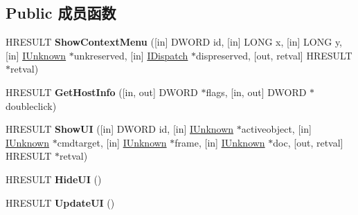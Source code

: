 \subsection*{Public 成员函数}
\begin{DoxyCompactItemize}
\item 
\mbox{\label{interface_i_doc_host_u_i_handler_dispatch_a6ec0e4b20d506e4c95957459a9c4de8c}} 
H\+R\+E\+S\+U\+LT {\bfseries Show\+Context\+Menu} (\mbox{[}in\mbox{]} D\+W\+O\+RD id, \mbox{[}in\mbox{]} L\+O\+NG x, \mbox{[}in\mbox{]} L\+O\+NG y, \mbox{[}in\mbox{]} \hyperlink{interface_i_unknown}{I\+Unknown} $\ast$unkreserved, \mbox{[}in\mbox{]} \hyperlink{interface_i_dispatch}{I\+Dispatch} $\ast$dispreserved, \mbox{[}out, retval\mbox{]} H\+R\+E\+S\+U\+LT $\ast$retval)
\item 
\mbox{\label{interface_i_doc_host_u_i_handler_dispatch_af64a9623759a8f97ec7f4f6321c84bca}} 
H\+R\+E\+S\+U\+LT {\bfseries Get\+Host\+Info} (\mbox{[}in, out\mbox{]} D\+W\+O\+RD $\ast$flags, \mbox{[}in, out\mbox{]} D\+W\+O\+RD $\ast$doubleclick)
\item 
\mbox{\label{interface_i_doc_host_u_i_handler_dispatch_af0ed8f3a22829fffdfa6aaac71b87a6c}} 
H\+R\+E\+S\+U\+LT {\bfseries Show\+UI} (\mbox{[}in\mbox{]} D\+W\+O\+RD id, \mbox{[}in\mbox{]} \hyperlink{interface_i_unknown}{I\+Unknown} $\ast$activeobject, \mbox{[}in\mbox{]} \hyperlink{interface_i_unknown}{I\+Unknown} $\ast$cmdtarget, \mbox{[}in\mbox{]} \hyperlink{interface_i_unknown}{I\+Unknown} $\ast$frame, \mbox{[}in\mbox{]} \hyperlink{interface_i_unknown}{I\+Unknown} $\ast$doc, \mbox{[}out, retval\mbox{]} H\+R\+E\+S\+U\+LT $\ast$retval)
\item 
\mbox{\label{interface_i_doc_host_u_i_handler_dispatch_ace2336c464880a1dae4bdcc6ef94e6e8}} 
H\+R\+E\+S\+U\+LT {\bfseries Hide\+UI} ()
\item 
\mbox{\label{interface_i_doc_host_u_i_handler_dispatch_ad962113565b582e733914a5f8a43ccd4}} 
H\+R\+E\+S\+U\+LT {\bfseries Update\+UI} ()
\item 
\mbox{\label{interface_i_doc_host_u_i_handler_dispatch_ad32a1a17d1d4702696e9ab00ed3bedc8}} 

\end{DoxyCompactItemize}
